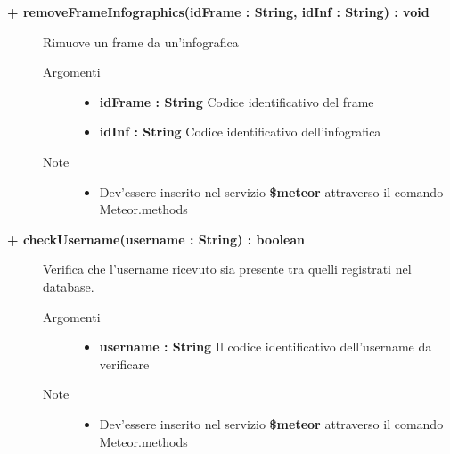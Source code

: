 \begin{description}
	\begin{description}
		\item[\textbf{\color{blue}+ removeFrameInfographics(idFrame : String, idInf : String) : void			}] \hfill
			Rimuove un frame da un'infografica
			
		\begin{description}
			\item[Argomenti] \hfill
				\begin{itemize}
				
					\item \textbf{idFrame : String			} \hfill
					Codice identificativo del frame
					\item \textbf{idInf : String			} \hfill
					Codice identificativo dell'infografica
					
				\end{itemize}
			\item[Note] \hfill
			\begin{itemize}
					\item Dev'essere inserito nel servizio \textbf{\$meteor} attraverso il comando Meteor.methods
				\end{itemize}
		\end{description}
	\end{description}
	
	\begin{description}
		\item[\textbf{\color{blue}+ checkUsername(username : String) : boolean			}] \hfill
			Verifica che l'username ricevuto sia presente tra quelli registrati nel database.
			
		\begin{description}
			\item[Argomenti] \hfill
				\begin{itemize}
				
					\item \textbf{username : String			} \hfill
					Il codice identificativo dell'username da verificare
					
				\end{itemize}
			\item[Note] \hfill
			\begin{itemize}
					\item Dev'essere inserito nel servizio \textbf{\$meteor} attraverso il comando Meteor.methods
				\end{itemize}
		\end{description}
	\end{description}
	
\end{description}